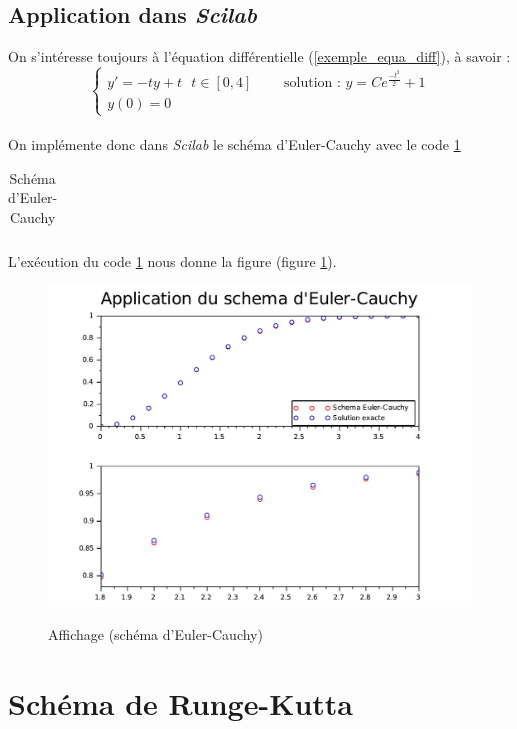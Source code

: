 \documentclass[a4paper,10pt]{report}
\begin{document}
\subsection{Application dans \textit{Scilab}}
On s'intéresse toujours à l'équation différentielle (\ref{exemple_equa_diff}), à savoir :\\
\begin{equation*}
\left\lbrace
\begin{array}{lll}
y'=-ty+t \ \ \ t \in [0,4] & \text{    } & \text{solution : }y=Ce^{\frac{-t^2}{2}}+1 \\
y(0)=0
\end{array}\right.
\end{equation*} \\

On implémente donc dans \textit{Scilab} le schéma d'Euler-Cauchy avec le code \ref{code_eulercauchy}
\begin{table}[H]
\caption{Schéma d'Euler-Cauchy}
\begin{tabular}{l}

\label{code_eulercauchy}
\end{tabular}
\end{table}

L'exécution du code \ref{code_eulercauchy} nous donne la figure (figure \ref{graph_euler_cauchy}).
\begin{figure}[H]
\centering
\caption{Affichage (schéma d'Euler-Cauchy)}
\includegraphics[width=\textwidth]{euler_cauchy.pdf}
\label{graph_euler_cauchy}
\end{figure}

\section{Schéma de Runge-Kutta}
\end{document}
